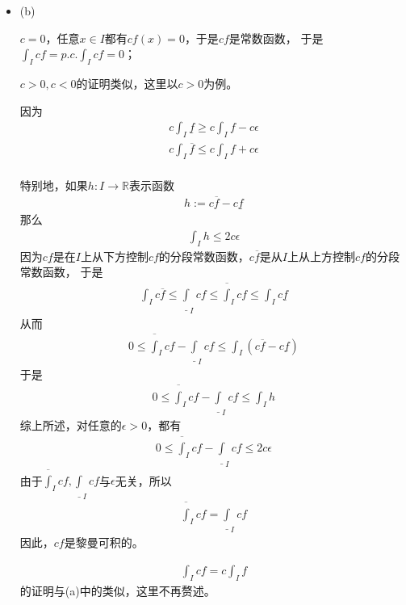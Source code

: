 \documentclass{article}
\begin{document}
\begin{itemize}
  \item (b)

        $c = 0$，任意$x \in I$都有$cf(x) = 0$，于是$cf$是常数函数，
        于是$\int_I cf = p.c.\int_I cf = 0$；

        $c > 0,c < 0$的证明类似，这里以$c > 0$为例。

        因为
        \begin{align*}
          c \int_I \underline{f} \geq c \int_I f - c\epsilon \\
          c \int_I \overline{f} \leq c \int_I f + c\epsilon  \\
        \end{align*}

        特别地，如果$h : I \to \mathbb{R}$表示函数
        \begin{align*}
          h := c\overline{f} - c\underline{f}
        \end{align*}
        那么
        \begin{align*}
          \int_I h \leq 2c\epsilon
        \end{align*}
        因为$c\underline{f}$是在$I$上从下方控制$cf$的分段常数函数，$c\overline{f}$是从$I$上从上方控制$cf$的分段常数函数，
        于是
        \begin{align*}
          \int_I c\overline{f} \leq \underline{\int}_I cf \leq \overline{\int}_I cf \leq \int_I c\underline{f}
        \end{align*}
        从而
        \begin{align*}
          0 \leq \overline{\int}_I cf - \underline{\int}_I cf \leq \int_I (c\overline{f} - c\underline{f})
        \end{align*}
        于是
        \begin{align*}
          0 \leq \overline{\int}_I cf - \underline{\int}_I cf \leq \int_I h
        \end{align*}
        综上所述，对任意的$\epsilon > 0$，都有
        \begin{align*}
          0 \leq \overline{\int}_I cf - \underline{\int}_I cf \leq 2c\epsilon
        \end{align*}
        由于$\overline{\int}_I cf, \underline{\int}_I cf$与$\epsilon$无关，所以
        \begin{align*}
          \overline{\int}_I cf = \underline{\int}_I cf
        \end{align*}
        因此，$cf$是黎曼可积的。


        \begin{align*}
          \int_I cf = c\int_I f
        \end{align*}
        的证明与(a)中的类似，这里不再赘述。


\end{itemize}
\end{document}
